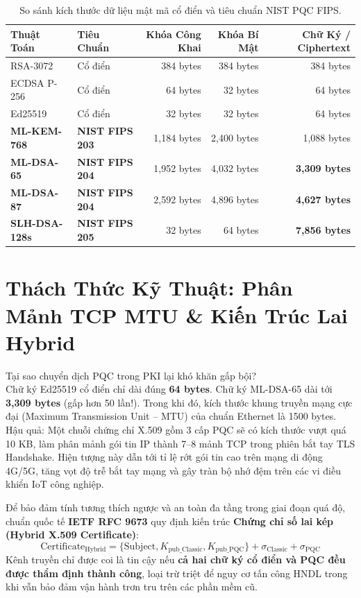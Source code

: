 \begin{table}[h]
\centering\small
\begin{tabularx}{\linewidth}{@{}l l r r r@{}}
\toprule
\textbf{Thuật Toán} & \textbf{Tiêu Chuẩn} & \textbf{Khóa Công Khai} & \textbf{Khóa Bí Mật} & \textbf{Chữ Ký / Ciphertext} \\
\midrule
RSA-3072 & Cổ điển & 384 bytes & 384 bytes & 384 bytes \\
ECDSA P-256 & Cổ điển & 64 bytes & 32 bytes & 64 bytes \\
Ed25519 & Cổ điển & 32 bytes & 32 bytes & 64 bytes \\
\midrule
\textbf{ML-KEM-768} & \textbf{NIST FIPS 203} & 1,184 bytes & 2,400 bytes & 1,088 bytes \\
\textbf{ML-DSA-65} & \textbf{NIST FIPS 204} & 1,952 bytes & 4,032 bytes & \textbf{3,309 bytes} \\
\textbf{ML-DSA-87} & \textbf{NIST FIPS 204} & 2,592 bytes & 4,896 bytes & \textbf{4,627 bytes} \\
\textbf{SLH-DSA-128s} & \textbf{NIST FIPS 205} & 32 bytes & 64 bytes & \textbf{7,856 bytes} \\
\bottomrule
\end{tabularx}
\caption{So sánh kích thước dữ liệu mật mã cổ điển và tiêu chuẩn NIST PQC FIPS.}
\end{table}

\section{Thách Thức Kỹ Thuật: Phân Mảnh TCP MTU \& Kiến Trúc Lai Hybrid}

\begin{batngo}
Tại sao chuyển dịch PQC trong PKI lại khó khăn gấp bội?\\
Chữ ký Ed25519 cổ điển chỉ dài đúng \textbf{64 bytes}. Chữ ký ML-DSA-65 dài tới \textbf{3,309 bytes} (gấp hơn 50 lần!). Trong khi đó, kích thước khung truyền mạng cực đại (Maximum Transmission Unit -- MTU) của chuẩn Ethernet là 1500 bytes.\\
Hậu quả: Một chuỗi chứng chỉ X.509 gồm 3 cấp PQC sẽ có kích thước vượt quá 10 KB, làm phân mảnh gói tin IP thành 7--8 mảnh TCP trong phiên bắt tay TLS Handshake. Hiện tượng này dẫn tới tỉ lệ rớt gói tin cao trên mạng di động 4G/5G, tăng vọt độ trễ bắt tay mạng và gây tràn bộ nhớ đệm trên các vi điều khiển IoT công nghiệp.
\end{batngo}

Để bảo đảm tính tương thích ngược và an toàn đa tầng trong giai đoạn quá độ, chuẩn quốc tế \textbf{IETF RFC 9673} quy định kiến trúc \textbf{Chứng chỉ số lai kép (Hybrid X.509 Certificate)}:
\begin{equation}
\text{Certificate}_{\text{Hybrid}} = \{\text{Subject}, K_{\text{pub\_Classic}}, K_{\text{pub\_PQC}}\} + \sigma_{\text{Classic}} + \sigma_{\text{PQC}}
\end{equation}
Kênh truyền chỉ được coi là tin cậy nếu \textbf{cả hai chữ ký cổ điển và PQC đều được thẩm định thành công}, loại trừ triệt để nguy cơ tấn công HNDL trong khi vẫn bảo đảm vận hành trơn tru trên các phần mềm cũ.

